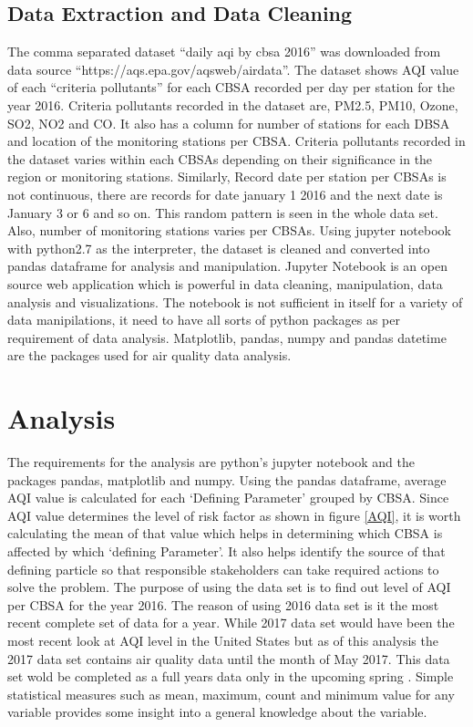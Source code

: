 \documentclass[sigconf]{acmart}
\begin{document}
{  \subsection{Data Extraction and Data Cleaning} The comma separated dataset ``daily aqi by cbsa 2016'' was downloaded from data source ``https://aqs.epa.gov/aqsweb/airdata''. The dataset shows AQI value of each ``criteria pollutants'' for each CBSA recorded per day per station for the year 2016. Criteria pollutants recorded in the dataset are, PM2.5, PM10, Ozone, SO2, NO2 and CO. It also has a column for number of stations for each DBSA and location of the monitoring stations per CBSA.
  Criteria pollutants recorded in the dataset varies within each CBSAs depending on their significance in the region or monitoring stations. Similarly, Record date per station per CBSAs is not continuous, there are records for date january 1 2016 and the next date is January 3 or 6 and so on. This random pattern is seen in the whole data set. Also, number of monitoring stations varies per CBSAs.
  Using jupyter notebook with python2.7 as the interpreter, the dataset is cleaned and converted  into pandas dataframe for analysis and manipulation. Jupyter Notebook is an open source web application which is powerful in data cleaning, manipulation, data analysis and visualizations. The notebook is not sufficient in itself for a variety of data manipilations, it need to have all sorts of python packages as per requirement of data analysis. Matplotlib, pandas, numpy and pandas datetime are the packages used for air quality data analysis.
  
  \section{Analysis} The requirements for the analysis are python's jupyter notebook and the packages pandas, matplotlib and numpy. Using the pandas dataframe, average AQI value is calculated for each `Defining Parameter' grouped by CBSA.  Since AQI value determines the level of risk factor as shown in figure \ref{AQI}, it is worth calculating the mean of that value which helps in determining which CBSA is affected by which `defining Parameter'. It also helps identify the source of that defining particle so that responsible stakeholders can take required actions to solve the problem. The purpose of using the data set is to find out level of AQI per CBSA  for the year 2016. The reason of using 2016 data set is it the most recent complete set of data for a year. While 2017 data set would have been the most recent look at AQI level in the United States but as of this analysis the 2017 data set contains air quality data until the month of May 2017. This data set wold be completed as a full years data only in the upcoming spring \cite{outdoor-air}.
  Simple statistical measures such as mean, maximum, count and minimum value for any variable provides some insight into a general knowledge about the variable.  
  
}
\end{document}
